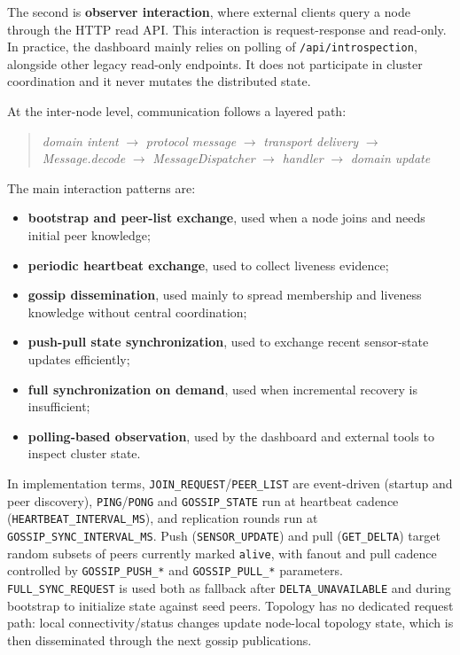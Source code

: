 The second is \textbf{observer interaction}, where external clients query a node through the HTTP read API. This interaction is request-response and read-only. In practice, the dashboard mainly relies on polling of \texttt{/api/introspection}, alongside other legacy read-only endpoints. It does not participate in cluster coordination and it never mutates the distributed state.

At the inter-node level, communication follows a layered path:
\begin{quote}
\emph{domain intent} $\rightarrow$ \emph{protocol message} $\rightarrow$ \emph{transport delivery} $\rightarrow$ \emph{Message.decode} $\rightarrow$ \emph{MessageDispatcher} $\rightarrow$ \emph{handler} $\rightarrow$ \emph{domain update}
\end{quote}

The main interaction patterns are:
\begin{itemize}
  \item \textbf{bootstrap and peer-list exchange}, used when a node joins and needs initial peer knowledge;
  \item \textbf{periodic heartbeat exchange}, used to collect liveness evidence;
  \item \textbf{gossip dissemination}, used mainly to spread membership and liveness knowledge without central coordination;
  \item \textbf{push-pull state synchronization}, used to exchange recent sensor-state updates efficiently;
  \item \textbf{full synchronization on demand}, used when incremental recovery is insufficient;
  \item \textbf{polling-based observation}, used by the dashboard and external tools to inspect cluster state.
\end{itemize}

In implementation terms, \texttt{JOIN\_REQUEST}/\texttt{PEER\_LIST} are event-driven (startup and peer discovery), \texttt{PING}/\texttt{PONG} and \texttt{GOSSIP\_STATE} run at heartbeat cadence (\texttt{HEARTBEAT\_INTERVAL\_MS}), and replication rounds run at \texttt{GOSSIP\_SYNC\_INTERVAL\_MS}. Push (\texttt{SENSOR\_UPDATE}) and pull (\texttt{GET\_DELTA}) target random subsets of peers currently marked \texttt{alive}, with fanout and pull cadence controlled by \texttt{GOSSIP\_PUSH\_*} and \texttt{GOSSIP\_PULL\_*} parameters. \texttt{FULL\_SYNC\_REQUEST} is used both as fallback after \texttt{DELTA\_UNAVAILABLE} and during bootstrap to initialize state against seed peers. Topology has no dedicated request path: local connectivity/status changes update node-local topology state, which is then disseminated through the next gossip publications.

